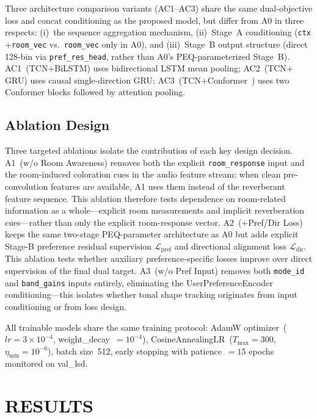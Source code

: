 \documentclass{aes2e}
\begin{document}
Three architecture comparison variants (AC1--AC3) share the same
dual-objective loss and concat conditioning as the proposed model, but differ
from A0 in three respects: (i)~the sequence aggregation mechanism,
(ii)~Stage~A conditioning (\texttt{ctx}$+$\texttt{room\_vec}
vs.\ \texttt{room\_vec} only in A0), and (iii)~Stage~B output structure
(direct 128-bin via \texttt{pref\_res\_head}, rather than A0's
PEQ-parameterized Stage~B).
AC1~(TCN$+$BiLSTM) uses bidirectional LSTM mean pooling;
AC2~(TCN$+$GRU) uses causal single-direction GRU;
AC3~(TCN$+$Conformer~\cite{gulati2020}) uses two Conformer blocks followed
by attention pooling.

\subsection{Ablation Design}

Three targeted ablations isolate the contribution of each key design decision.
A1~(w/o Room Awareness) removes both the explicit \texttt{room\_response}
input and the room-induced coloration cues in the audio feature stream: when
clean pre-convolution features are available, A1 uses them instead of the
reverberant feature sequence. This ablation therefore tests dependence on
room-related information as a whole---explicit room measurements and implicit
reverberation cues---rather than only the explicit room-response vector.
A2~(+Pref/Dir Loss) keeps the same two-stage PEQ-parameter architecture as A0
but adds explicit Stage-B preference residual supervision
$\mathcal{L}_\text{pref}$ and directional alignment loss
$\mathcal{L}_\text{dir}$. This ablation tests whether auxiliary
preference-specific losses improve over direct supervision of the final
dual target.
A3~(w/o Pref Input) removes both \texttt{mode\_id} and \texttt{band\_gains}
inputs entirely, eliminating the UserPreferenceEncoder conditioning---this
isolates whether tonal shape tracking originates from input conditioning or
from loss design.

All trainable models share the same training protocol: AdamW
optimizer~($lr = 3 \times 10^{-4}$, weight\_decay~$= 10^{-4}$),
CosineAnnealingLR~($T_\text{max} = 300$, $\eta_\text{min} = 10^{-6}$),
batch size~512, early stopping with patience~$= 15$ epochs
monitored on val\_lsd.

\section{RESULTS}
\end{document}
